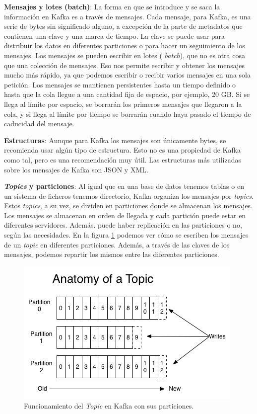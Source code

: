 \textbf{Mensajes y lotes (batch)}: La forma en que se introduce y se saca
la información en Kafka es a través de mensajes. Cada mensaje, para Kafka,
es una serie de bytes sin significado alguno, a excepción de la parte de
metadatos que contienen una clave y una marca de tiempo. La clave se puede
usar para distribuir los datos en diferentes particiones o para hacer un
seguimiento de los mensajes. Los mensajes se pueden escribir en lotes ({\em
  batch}), que no es otra cosa que una colección de mensajes. Eso nos
permite escribir y obtener los mensajes mucho más rápido, ya que podemos
escribir o recibir varios mensajes en una sola petición. Los mensajes se
mantienen persistentes hasta un tiempo definido o hasta que la cola llegue
a una cantidad fija de espacio, por ejemplo, 20 GB. Si se llega al límite
por espacio, se borrarán los primeros mensajes que llegaron a la cola, y si
llega al límite por tiempo se borrarán cuando haya pasado el tiempo de
caducidad del mensaje.

\textbf{Estructuras}: Aunque para Kafka los mensajes son únicamente bytes,
se recomienda usar algún tipo de estructura. Esto no es una propiedad de
Kafka como tal, pero es una recomendación muy útil. Las estructuras más
utilizadas sobre los mensajes de Kafka son JSON y XML.

\textbf{\emph{Topics} y particiones}: Al igual que en una base de datos tenemos
tablas o en un sistema de ficheros tenemos directorio, Kafka organiza los
mensajes por \emph{topics}. Estos \emph{topics}, a su vez, se dividen en particiones
donde se almacenan los mensajes. Los mensajes se almacenan en orden de
llegada y cada partición puede estar en diferentes servidores. Además.
puede haber replicación en las particiones o no, según las necesidades. En
la figura \ref{Kfk-img-1} \cite{Kfk-2} podemos ver cómo se escriben los
mensajes de un \emph{topic} en diferentes particiones. Además, a través de las
claves de los mensajes, podemos repartir los mismos entre las diferentes
particiones.


\begin{figure}[htp]
\centering
\includegraphics[scale=0.75]{Imagenes/kafka1.png}
\caption{Funcionamiento del \emph{Topic} en Kafka con sus particiones.}
\label{Kfk-img-1}
\end{figure}


